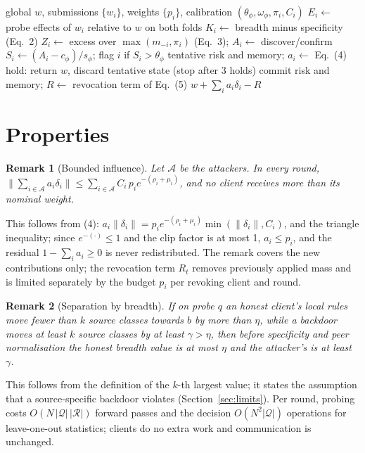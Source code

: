 \documentclass[conference]{IEEEtran}
\newtheorem{remark}{Remark}
\begin{document}
\begin{algorithm}[t]
\caption{One Fed-MediShield server round}
\label{alg:round}
\begin{algorithmic}[1]
\Require global $w$, submissions $\{w_i\}$, weights $\{p_i\}$, calibration $(\theta_\phi, \omega_\phi, \pi_i, C_i)$
  \State $E_i \gets$ probe effects of $w_i$ relative to $w$ on both folds
  \State $K_i \gets$ breadth minus specificity (Eq.~2)
\EndFor
{}
  \State $Z_i \gets$ excess over $\max(m_{-i}, \pi_i)$ (Eq.~3); $A_i \gets$ discover/confirm
  \State $S_i \gets (A_i-c_\phi)/s_\phi$; flag $i$ if $S_i > \theta_\phi$
  \State tentative risk and memory; $a_i \gets$ Eq.~(4)
\EndFor
{}
  \State hold: return $w$, discard tentative state (stop after 3 holds)
\EndIf
\State commit risk and memory; $R \gets$ revocation term of Eq.~(5)
\State \Return $w + \sum_i a_i \delta_i - R$
\end{algorithmic}
\end{algorithm}

\section{Properties}
\begin{remark}[Bounded influence]
Let $\mathcal{A}$ be the attackers. In every round, $\lVert \sum_{i \in \mathcal{A}} a_i \delta_i \rVert \le \sum_{i \in \mathcal{A}} C_i\, p_i e^{-(\rho_i+\mu_i)}$, and no client receives more than its nominal weight.
\end{remark}
This follows from (4): $a_i \lVert \delta_i \rVert = p_i e^{-(\rho_i+\mu_i)} \min(\lVert \delta_i \rVert, C_i)$, and the triangle inequality; since $e^{-(\cdot)} \le 1$ and the clip factor is at most 1, $a_i \le p_i$, and the residual $1-\sum_i a_i \ge 0$ is never redistributed. The remark covers the new contributions only; the revocation term $R_t$ removes previously applied mass and is limited separately by the budget $p_i$ per revoking client and round.

\begin{remark}[Separation by breadth]
If on probe $q$ an honest client's local rules move fewer than $k$ source classes towards $b$ by more than $\eta$, while a backdoor moves at least $k$ source classes by at least $\gamma > \eta$, then before specificity and peer normalisation the honest breadth value is at most $\eta$ and the attacker's is at least $\gamma$.
\end{remark}
This follows from the definition of the $k$-th largest value; it states the assumption that a source-specific backdoor violates (Section~\ref{sec:limits}). Per round, probing costs $O(N\,|\mathcal{Q}|\,|\mathcal{R}|)$ forward passes and the decision $O(N^2 |\mathcal{Q}|)$ operations for leave-one-out statistics; clients do no extra work and communication is unchanged.
\end{document}
